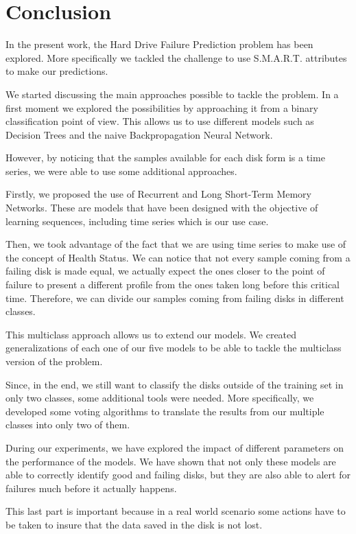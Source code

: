 \chapter{Conclusion}\label{chap:conclusion}

In the present work, the Hard Drive Failure Prediction problem has been explored.
More specifically we tackled the challenge to use S.M.A.R.T. attributes to make our predictions.

We started discussing the main approaches possible to tackle the problem.
In a first moment we explored the possibilities by approaching it from a binary classification point of view.
This allows us to use different models such as Decision Trees and the naive Backpropagation Neural Network.

However, by noticing that the samples available for each disk form is a time series, we were able to use some additional approaches.

Firstly, we proposed the use of Recurrent and Long Short-Term Memory Networks.
These are models that have been designed with the objective of learning sequences, including time series which is our use case.

Then, we took advantage of the fact that we are using time series to make use of the concept of Health Status.
We can notice that not every sample coming from a failing disk is made equal, we actually expect the ones closer to the point of failure to present a different profile from the ones taken long before this critical time.
Therefore, we can divide our samples coming from failing disks in different classes.

This multiclass approach allows us to extend our models.
We created generalizations of each one of our five models to be able to tackle the multiclass version of the problem.

Since, in the end, we still want to classify the disks outside of the training set in only two classes, some additional tools were needed.
More specifically, we developed some voting algorithms to translate the results from our multiple classes into only two of them.

During our experiments, we have explored the impact of different parameters on the performance of the models.
We have shown that not only these models are able to correctly identify good and failing disks, but they are also able to alert for failures much before it actually happens.

This last part is important because in a real world scenario some actions have to be taken to insure that the data saved in the disk is not lost.

